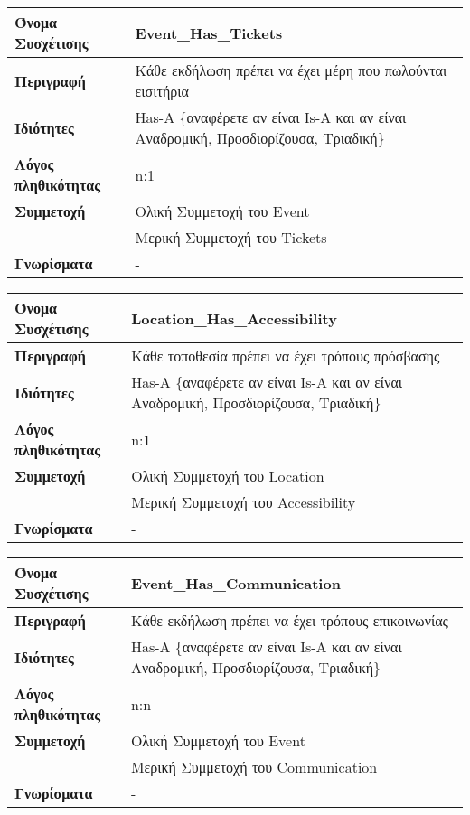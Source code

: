 \begin{tabular}[]{|p{4cm}|p{10cm}|}
  \hline
  \textbf{Όνομα Συσχέτισης} & Event\_Has\_Tickets\\ \hline
  \textbf{Περιγραφή} & Κάθε εκδήλωση πρέπει να έχει μέρη που πωλούνται εισιτήρια\\ \hline
  \textbf{Ιδιότητες} & Has-A \{αναφέρετε αν είναι Is-A και αν είναι
                       Αναδρομική, Προσδιορίζουσα, Τριαδική\} \\ \hline
  \textbf{Λόγος πληθικότητας} & n:1 \\ \hline
  \textbf{Συμμετοχή} & Ολική Συμμετοχή του Event \\ \cline{2-2}
                     & Μερική Συμμετοχή του Tickets\\ \hline
  \textbf{Γνωρίσματα} & - \\ \hline
\end{tabular}

\begin{tabular}[]{|p{4cm}|p{10cm}|}
  \hline
  \textbf{Όνομα Συσχέτισης} & Location\_Has\_Accessibility\\ \hline
  \textbf{Περιγραφή} & Κάθε τοποθεσία πρέπει να έχει τρόπους πρόσβασης\\ \hline
  \textbf{Ιδιότητες} & Has-A \{αναφέρετε αν είναι Is-A και αν είναι
                       Αναδρομική, Προσδιορίζουσα, Τριαδική\} \\ \hline
  \textbf{Λόγος πληθικότητας} & n:1 \\ \hline
  \textbf{Συμμετοχή} & Ολική Συμμετοχή του Location \\ \cline{2-2}
                     & Μερική Συμμετοχή του Accessibility\\ \hline
  \textbf{Γνωρίσματα} & - \\ \hline
\end{tabular}

\begin{tabular}[]{|p{4cm}|p{10cm}|}
  \hline
  \textbf{Όνομα Συσχέτισης} & Event\_Has\_Communication\\ \hline
  \textbf{Περιγραφή} & Κάθε εκδήλωση πρέπει να έχει τρόπους επικοινωνίας\\ \hline
  \textbf{Ιδιότητες} & Has-A \{αναφέρετε αν είναι Is-A και αν είναι
                       Αναδρομική, Προσδιορίζουσα, Τριαδική\} \\ \hline
  \textbf{Λόγος πληθικότητας} & n:n \\ \hline
  \textbf{Συμμετοχή} & Ολική Συμμετοχή του Event \\ \cline{2-2}
                     & Μερική Συμμετοχή του Communication \\ \hline
  \textbf{Γνωρίσματα} & - \\ \hline
\end{tabular}

